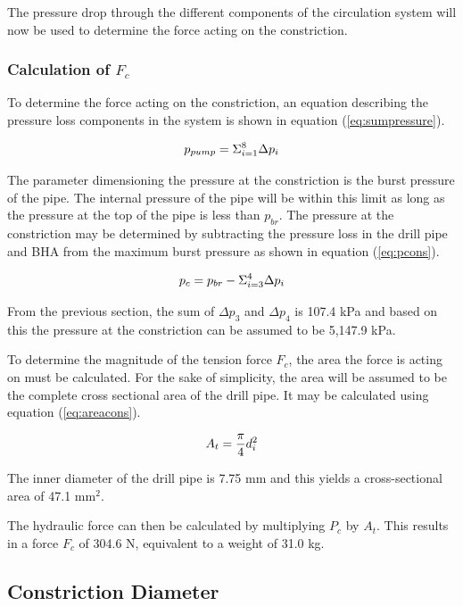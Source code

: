 The pressure drop through the different components of the circulation system will now be used to determine the force acting on the constriction.

\subsubsection{Calculation of $F_c$}
To determine the force acting on the constriction, an equation describing the pressure loss components in the system is shown in equation (\ref{eq:sumpressure}). 

\begin{equation}
\centering
   p_{pump}=\Sigma_{i=1}^{8} \Delta p_i
\label{eq:sumpressure}
\end{equation}

The parameter dimensioning the pressure at the constriction is the burst pressure of the pipe. The internal pressure of the pipe will be within this limit as long as the pressure at the top of the pipe is less than $p_{br}$. The pressure at the constriction may be determined by subtracting the pressure loss in the drill pipe and BHA from the maximum burst pressure as shown in equation (\ref{eq:pcons}).

\begin{equation}
\centering
   p_{c}=p_{br} -\Sigma_{i=3}^{4} \Delta p_i
\label{eq:pcons}
\end{equation}

From the previous section, the sum of $\Delta p_3$ and $\Delta p_4$ is 107.4 kPa and based on this the pressure at the constriction can be assumed to be 5,147.9 kPa.

To determine the magnitude of the tension force $F_c$, the area the force is acting on must be calculated. For the sake of simplicity, the area will be assumed to be the complete cross sectional area of the drill pipe. It may be calculated using equation (\ref{eq:areacons}).

\begin{equation}
\centering
   A_t = \frac{\pi}{4} d_i^2
\label{eq:areacons}
\end{equation}

The inner diameter of the drill pipe is 7.75 mm and this yields a cross-sectional area of 47.1 mm$^2$.

The hydraulic force can then be calculated by multiplying $P_c$ by $A_t$. This results in a force $F_c$ of 304.6 N, equivalent to a weight of 31.0 kg. 


\subsection{Constriction Diameter}

